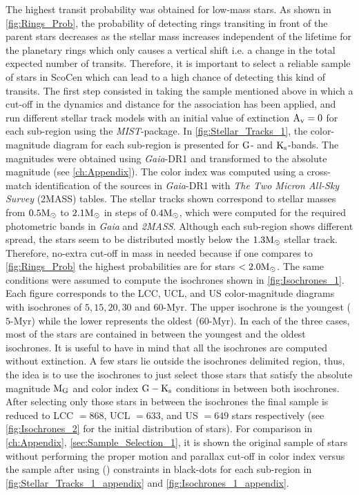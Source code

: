The highest transit probability was obtained for low-mass stars. As shown in \autoref{fig:Rings_Prob}, the probability of detecting rings transiting in front of the parent stars decreases as the stellar mass increases independent of the lifetime for the planetary rings which only causes a vertical shift i.e. a change in the total expected number of transits. Therefore, it is important to select a reliable sample of stars in ScoCen which can lead to a high chance of detecting this kind of transits. The first step consisted in taking the sample mentioned above in which a cut-off in the dynamics and distance for the association has been applied, and run different stellar track models with an initial value of extinction $\textnormal{A}_\textnormal{v} = 0$ for each sub-region using the \textit{MIST}-package. In \autoref{fig:Stellar_Tracks_1}, the color-magnitude diagram for each sub-region is presented for $\textnormal{G}$- and $\textnormal{K}_\textnormal{s}$-bands. The magnitudes were obtained using \textit{Gaia}-DR1 and transformed to the absolute magnitude (see \autoref{ch:Appendix}). The color index was computed using a cross-match identification of the sources in \textit{Gaia}-DR1 with \textit{The Two Micron All-Sky Survey} (2MASS) tables. The stellar tracks shown correspond to stellar masses from $0.5 \textnormal{M}_\odot$ to  $2.1 \textnormal{M}_\odot$ in steps of $0.4 \textnormal{M}_\odot$, which were computed for the required photometric bands in \textit{Gaia} and \textit{2MASS}. Although each sub-region shows different spread, the stars seem to be distributed mostly below the $1.3 \textnormal{M}_\odot$ stellar track. Therefore, no-extra cut-off in mass in needed because if one compares to \autoref{fig:Rings_Prob} the highest probabilities are for stars $< 2.0 \textnormal{M}_\odot$. The same conditions were assumed to compute the isochrones shown in \autoref{fig:Isochrones_1}. Each figure corresponds to the LCC, UCL, and US color-magnitude diagrams with isochrones of $5, 15, 20, 30$ and $60$-Myr. The upper isochrone is the youngest ($5$-Myr) while the lower represents the oldest ($60$-Myr). In each of the three cases, most of the stars are contained in between the youngest and the oldest isochrones. It is useful to have in mind that all the isochrones are computed without extinction. A few stars lie outside the isochrones delimited region, thus, the idea is to use the isochrones to just select those stars that satisfy the absolute magnitude $\textnormal{M}_\textnormal{G}$ and color index $\textnormal{G} - \textnormal{K}_\textnormal{s}$ conditions in between both isochrones. After selecting only those stars in between the isochrones the final sample is reduced to LCC $= 868$, UCL $= 633$, and US $= 649$ stars respectively (see \autoref{fig:Isochrones_2} for the initial distribution of stars). For comparison in \autoref{ch:Appendix}, \autoref{sec:Sample_Selection_1}, it is shown the original sample of stars without performing the proper motion and parallax cut-off in color index versus the sample after using  (\citeyear{2016MNRAS.461..794P}) constraints in black-dots for each sub-region in \autoref{fig:Stellar_Tracks_1_appendix} and \autoref{fig:Isochrones_1_appendix}.\\       

